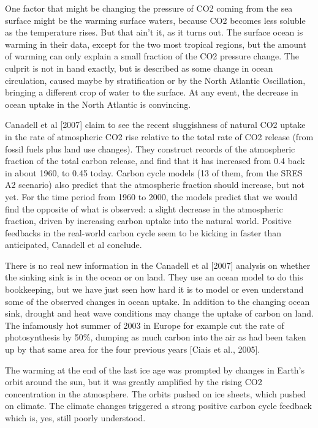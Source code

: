 \documentclass[
]{book}
\begin{document}
One factor that might be changing the pressure of CO2 coming from the sea surface might be the warming surface waters, because CO2 becomes less soluble as the temperature rises. But that ain't it, as it turns out. The surface ocean is warming in their data, except for the two most tropical regions, but the amount of warming can only explain a small fraction of the CO2 pressure change. The culprit is not in hand exactly, but is described as some change in ocean circulation, caused maybe by stratification or by the North Atlantic Oscillation, bringing a different crop of water to the surface. At any event, the decrease in ocean uptake in the North Atlantic is convincing.

Canadell et al {[}2007{]} claim to see the recent sluggishness of natural CO2 uptake in the rate of atmospheric CO2 rise relative to the total rate of CO2 release (from fossil fuels plus land use changes). They construct records of the atmospheric fraction of the total carbon release, and find that it has increased from 0.4 back in about 1960, to 0.45 today. Carbon cycle models (13 of them, from the SRES A2 scenario) also predict that the atmospheric fraction should increase, but not yet. For the time period from 1960 to 2000, the models predict that we would find the opposite of what is observed: a slight decrease in the atmospheric fraction, driven by increasing carbon uptake into the natural world. Positive feedbacks in the real-world carbon cycle seem to be kicking in faster than anticipated, Canadell et al conclude.

There is no real new information in the Canadell et al {[}2007{]} analysis on whether the sinking sink is in the ocean or on land. They use an ocean model to do this bookkeeping, but we have just seen how hard it is to model or even understand some of the observed changes in ocean uptake. In addition to the changing ocean sink, drought and heat wave conditions may change the uptake of carbon on land. The infamously hot summer of 2003 in Europe for example cut the rate of photosynthesis by 50\%, dumping as much carbon into the air as had been taken up by that same area for the four previous years {[}Ciais et al., 2005{]}.

The warming at the end of the last ice age was prompted by changes in Earth's orbit around the sun, but it was greatly amplified by the rising CO2 concentration in the atmosphere. The orbits pushed on ice sheets, which pushed on climate. The climate changes triggered a strong positive carbon cycle feedback which is, yes, still poorly understood.
\end{document}
